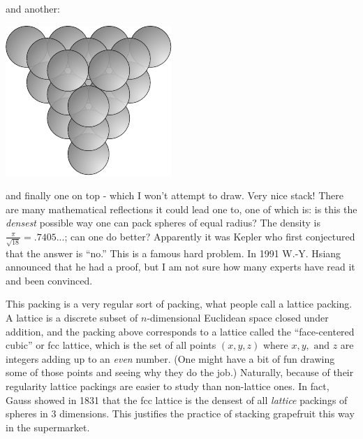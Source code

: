 and another:
\begin{center}
\includegraphics[]{figures/wk20_fig3.pdf}
\end{center}

and finally one on top - which I won't attempt to draw. Very nice stack! There are many mathematical reflections it could lead one to, one of which is: is this the \emph{densest} possible way one can pack spheres of equal radius? The density is $\frac{\pi}{\sqrt{18}} = .7405...$; can one do better? Apparently it was Kepler who first conjectured that the answer is ``no.'' This is a famous hard problem. In 1991 W.-Y. Hsiang announced that he had a proof, but I am not sure how many experts have read it and been convinced.

This packing is a very regular sort of packing, what people call a lattice packing. A lattice is a discrete subset of $n$-dimensional Euclidean space closed under addition, and the packing above corresponds to a lattice called the ``face-centered cubic'' or fcc lattice, which is the set of all points $(x,y,z)$ where $x, y,\text{ and }z$ are integers adding up to an \emph{even} number. (One might have a bit of fun drawing some of those points and seeing why they do the job.) Naturally, because of their regularity lattice packings are easier to study than non-lattice ones. In fact, Gauss showed in 1831 that the fcc lattice is the densest of all \emph{lattice} packings of spheres in 3 dimensions. This justifies the practice of stacking grapefruit this way in the supermarket.

